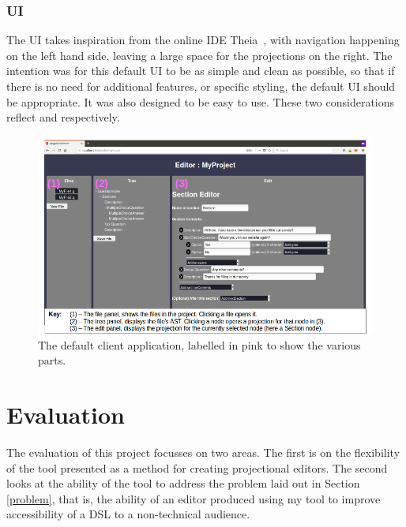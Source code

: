 \documentclass{article}
\begin{document}
{\subsubsection{UI}
The UI takes inspiration from the online IDE Theia~\cite{theia}, with navigation happening on the left hand side, leaving a large space for the projections on the right. The intention was for this default UI to be as simple and clean as possible, so that if there is no need for additional features, or specific styling, the default UI should be appropriate. It was also designed to be easy to use. These two considerations reflect \RSetup and \RIntuitive respectively.
\begin{figure}[h!]
  \centering
  \includegraphics[width=\linewidth]{./Screenshots/labelledUI.png}
  \caption{The default client application, labelled in pink to show the various parts.}
  \label{fig:webUI}
\end{figure}
%
%
\section{Evaluation}\label{evaluation}
The evaluation of this project focusses on two areas. The first is on the flexibility of the tool presented as a method for creating projectional editors. The second looks at the ability of the tool to address the problem laid out in Section \ref{problem}, that is, the ability of an editor produced using my tool to improve accessibility of a DSL to a non-technical audience.
}
\end{document}
